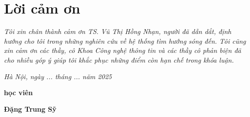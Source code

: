 \clearpage
{}

\chapter*{Lời cảm ơn}

\textit{Tôi xin chân thành cảm ơn TS. Vũ Thị Hồng Nhạn, người đã dẫn dắt, định hướng cho tôi trong những nghiên cứu về hệ thống tìm hướng sóng đến. Tôi cũng xin cảm ơn các thầy, cô Khoa Công nghệ thông tin và các thầy cô phản biện đã cho nhiều góp ý giúp tôi khắc phục những điểm còn hạn chế trong khóa luận.}

\vspace{1cm}
\hspace{7cm}\textit{Hà Nội, ngày ... tháng ... năm 2025}

\hspace{9.4cm}\textbf{học viên}
\vspace{2.5cm}


\hspace{9cm}\textbf{Đặng Trung Sỹ}

